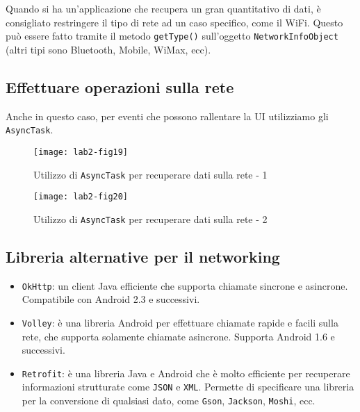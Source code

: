 Quando si ha un'applicazione che recupera un gran quantitativo di dati, è
consigliato restringere il tipo di rete ad un caso specifico, come il WiFi.
Questo può essere fatto tramite il metodo \texttt{getType()} sull'oggetto
\texttt{NetworkInfoObject} (altri tipi sono Bluetooth, Mobile, WiMax, ecc).

\subsection{Effettuare operazioni sulla rete}

Anche in questo caso, per eventi che possono rallentare la UI utilizziamo gli
\texttt{AsyncTask}.

\begin{figure}[htbp]
        \centering
        \texttt{[image: lab2-fig19]}
        \caption[AsyncTask sulla rete - 1]{Utilizzo di \texttt{AsyncTask} per
recuperare dati sulla rete - 1}
        \label{img:lab2-fig19}
\end{figure}

\begin{figure}[htbp]
        \centering
        \texttt{[image: lab2-fig20]}
        \caption[AsyncTask sulla rete - 2]{Utilizzo di \texttt{AsyncTask} per
recuperare dati sulla rete - 2}
        \label{img:lab2-fig20}
\end{figure}

\subsection{Libreria alternative per il networking}

\begin{itemize}
\item \texttt{OkHttp}: un client Java efficiente che supporta chiamate sincrone
e asincrone. Compatibile con Android 2.3 e successivi.
\item \texttt{Volley}: è una libreria Android per effettuare chiamate rapide e
facili sulla rete, che supporta solamente chiamate asincrone. Supporta Android
1.6 e successivi.
\item \texttt{Retrofit}: è una libreria Java e Android che è molto efficiente
per recuperare informazioni strutturate come \texttt{JSON} e \texttt{XML}.
Permette di specificare una libreria per la conversione di qualsiasi dato, come
\texttt{Gson}, \texttt{Jackson}, \texttt{Moshi}, ecc.
\end{itemize}
